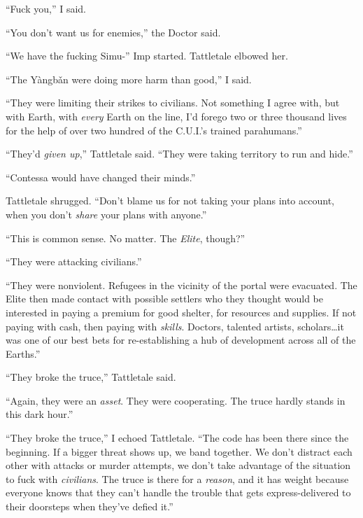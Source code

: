 ``Fuck you,'' I said.



``You don't want us for enemies,'' the Doctor said.



``We have the fucking Simu-'' Imp started.  Tattletale elbowed her.



``The Y\`{a}ngb\v{a}n were doing more harm than good,'' I said.



``They were limiting their strikes to civilians.  Not something I agree with, but with Earth, with \emph{every} Earth on the line, I'd forego two or three thousand lives for the help of over two hundred of the C.U.I.'s trained parahumans.''



``They'd \emph{given up},'' Tattletale said.  ``They were taking territory to run and hide.''



``Contessa would have changed their minds.''



Tattletale shrugged.  ``Don't blame us for not taking your plans into account, when you don't \emph{share} your plans with anyone.''



``This is common sense.  No matter.  The \emph{Elite}, though?''



``They were attacking civilians.''



``They were nonviolent.  Refugees in the vicinity of the portal were evacuated.  The Elite then made contact with possible settlers who they thought would be interested in paying a premium for good shelter, for resources and supplies.  If not paying with cash, then paying with \emph{skills}.  Doctors, talented artists, scholars\ldots it was one of our best bets for re-establishing a hub of development across all of the Earths.''



``They broke the truce,'' Tattletale said.



``Again, they were an \emph{asset}.  They were cooperating.  The truce hardly stands in this dark hour.''



``They broke the truce,'' I echoed Tattletale.  ``The code has been there since the beginning.  If a bigger threat shows up, we band together.  We don't distract each other with attacks or murder attempts, we don't take advantage of the situation to fuck with \emph{civilians}.  The truce is there for a \emph{reason}, and it has weight because everyone knows that they can't handle the trouble that gets express-delivered to their doorsteps when they've defied it.''



